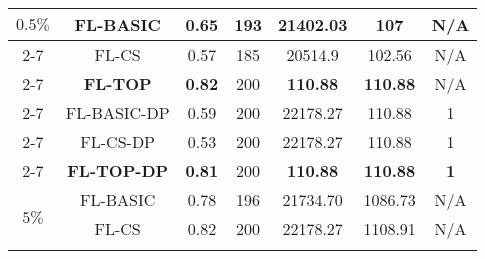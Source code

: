 \documentclass[accepted]{uai2021} %
\begin{document}
\begin{table*}[!ht]
\begin{minipage}{.5\linewidth}
{\begin{tabular}{|c|c|c|c|c|c|c|}
        \multirow{8}{*}{$0.5\%$} &  FL-BASIC   &  0.65  & 193 & 21402.03 & 107 & N/A  \\
        \cline{2-7}
        &  FL-CS  &  0.57  & 185 & 20514.9 & 102.56 & N/A  \\
        \cline{2-7}
        &  \textbf{FL-TOP}   & \textbf{0.82}  & 200 & \textbf{110.88} & \textbf{110.88} & N/A \\
        \cline{2-7}
        \cline{2-7}
        &  FL-BASIC-DP   &  0.59  & 200 & 22178.27 & 110.88 & 1\\
        \cline{2-7}
        &  FL-CS-DP  &  0.53  & 200 & 22178.27 & 110.88 & 1\\
        \cline{2-7}
        &  \textbf{FL-TOP-DP}   & \textbf{0.81} & 200 & \textbf{110.88}  & \textbf{110.88} & \textbf{1}\\
        \hline 
        \hline
        \multirow{8}{*}{$5\%$} &  FL-BASIC   &  0.78 & 196 & 21734.70 & 1086.73 & N/A  \\
        \cline{2-7}
        &  FL-CS  &  0.82  & 200 & 22178.27 & 1108.91 & N/A  \\
        \cline{2-7}

\end{tabular}}
\end{minipage}
\end{table*}
\end{document}
